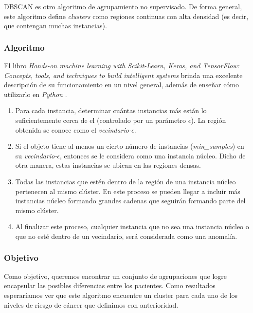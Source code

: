 \documentclass[journal]{IEEEtran}
\begin{document}
            DBSCAN es otro algoritmo de agrupamiento no supervisado. De forma general, este algoritmo define \emph{clusters} como regiones continuas con alta densidad (es decir, que contengan muchas instancias).

            \subsubsection{Algoritmo}

                El libro \emph{Hands-on machine learning with Scikit-Learn, Keras, and TensorFlow: Concepts, tools, and techniques to build intelligent systems} brinda una excelente descripción de su funcionamiento en un nivel general, además de enseñar cómo utilizarlo en \emph{Python} \cite{geron2019hands}.

                \begin{enumerate}
                    \item Para cada instancia, determinar cuántas instancias más están lo suficientemente cerca de el (controlado por un parámetro $\epsilon$). La región obtenida se conoce como el \emph{vecindario-$\epsilon$}.
                    \item Si el objeto tiene al menos un cierto número de instancias (\emph{min\_samples}) en su \emph{vecindario-$\epsilon$}, entonces se le considera como una instancia núcleo. Dicho de otra manera, estas instancias se ubican en las regiones densas.
                    \item Todas las instancias que estén dentro de la región de una instancia núcleo pertenecen al mismo clúster. En este proceso se pueden llegar a incluir más instancias núcleo formando grandes cadenas que seguirán formando parte del mismo clúster.
                    \item Al finalizar este proceso, cualquier instancia que no sea una instancia núcleo o que no esté dentro de un vecindario, será considerada como una anomalía.
                \end{enumerate}
            
            \subsubsection{Objetivo}

                Como objetivo, queremos encontrar un conjunto de agrupaciones que logre encapsular las posibles diferencias entre los pacientes. Como resultados esperaríamos ver que este algoritmo encuentre un cluster para cada uno de los niveles de riesgo de cáncer que definimos con anterioridad.
\end{document}
